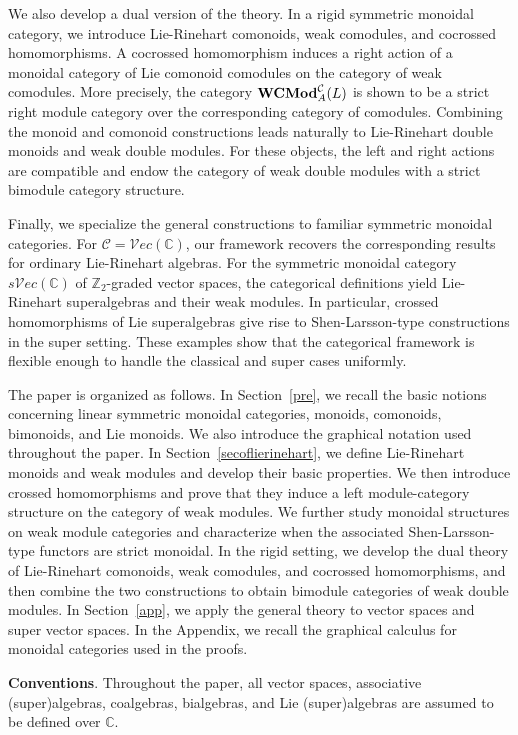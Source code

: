 \documentclass[11pt]{amsart}
\theoremstyle{definition}
\numberwithin{equation}{section}
\begin{document}
We also develop a dual version of the theory. 
In a rigid symmetric monoidal category, we introduce Lie-Rinehart comonoids, weak comodules, and cocrossed homomorphisms. 
A cocrossed homomorphism induces a right action of a monoidal category of Lie comonoid comodules on the category of weak comodules. 
More precisely, the category ${\bf WCMod}^{\mathcal C}_A(L)$
is shown to be a strict right module category over the corresponding category of comodules. 
Combining the monoid and comonoid constructions leads naturally to Lie-Rinehart double monoids and weak double modules. 
For these objects, the left and right actions are compatible and endow the category of weak double modules with a strict bimodule category structure.

Finally, we specialize the general constructions to familiar symmetric monoidal categories. 
For $\mathcal C=\mathcal{V}ec(\mathbb C)$, our framework recovers the corresponding results for ordinary Lie-Rinehart algebras. 
For the symmetric monoidal category
$s\mathcal{V}ec(\mathbb C)$ of $\mathbb Z_2$-graded vector spaces, the categorical definitions yield Lie-Rinehart superalgebras and their weak modules. 
In particular, crossed homomorphisms of Lie superalgebras give rise to Shen-Larsson-type constructions in the super setting. 
{These examples show that the categorical framework is flexible enough to handle the classical and super cases uniformly}.

The paper is organized as follows. 
In Section~\ref{pre}, we recall the basic notions concerning linear symmetric monoidal categories, monoids, comonoids, bimonoids, and Lie monoids. 
We also introduce the graphical notation used throughout the paper. 
In Section~\ref{secoflierinehart}, we define Lie-Rinehart monoids and weak modules and develop their basic properties. 
We then introduce crossed homomorphisms and prove that they induce a left module-category structure on the category of weak modules. 
We further study monoidal structures on weak module categories and characterize when the associated Shen-Larsson-type functors are strict monoidal. 
In the rigid setting, we develop the dual theory of Lie-Rinehart comonoids, weak comodules, and cocrossed homomorphisms, and then combine the two constructions to obtain bimodule categories of weak double modules. 
In Section~\ref{app}, we apply the general theory to vector spaces and super vector spaces. 
In the Appendix, we recall the graphical calculus for monoidal categories used in the proofs.

\textbf{Conventions}. 
Throughout the paper, all vector spaces, associative (super)algebras, coalgebras, bialgebras, and Lie (super)algebras are assumed to be defined over $\mathbb C$.
\end{document}
